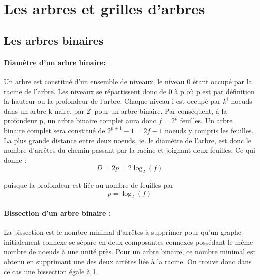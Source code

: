 \section{Les arbres et grilles d'arbres}

\subsection{Les arbres binaires}
\paragraph{Diamètre d'un arbre binaire: } Un arbre est constitué d'un ensemble de niveaux, le niveau 0 étant occupé par la racine de l'arbre.
Les niveaux se répartissent donc de 0 à p où p est par définition la hauteur ou la profondeur de l'arbre. Chaque niveau i est occupé 
par $k^{i}$  noeuds dans un arbre k-naire, par $2^{i}$ pour un arbre binaire. 
Par conséquent, à la profondeur p, un arbre binaire complet aura donc $f = 2^{p}$ 
feuilles. Un arbre binaire complet sera constitué de $2^{p+1}-1 = 2f-1$ noeuds y compris les feuilles.
La plus grande distance entre deux noeuds, ie. le diamètre de l'arbre, est donc le nombre d'arrêtes 
du chemin passant par la racine et joignant deux feuilles. Ce qui donne : \[D = 2p = 2\log_2(f)\]


puisque la profondeur est liée au nombre de feuilles par \[p = \log_2(f)\]


\paragraph{Bissection d'un arbre binaire : } La bissection est le nombre minimal d'arrêtes à supprimer pour qu'un graphe initialement
connexe se sépare en deux composantes connexes possédant le même nombre de noeuds à une unité près.
Pour un arbre binaire, ce nombre minimal est obtenu en supprimant une des deux arrêtes liée à la racine. On trouve
donc dans ce cas une bissection égale à 1.

